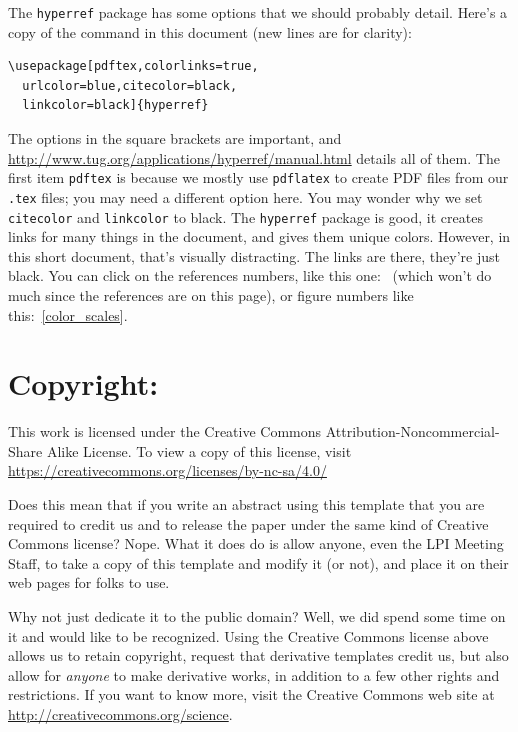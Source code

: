 \documentclass[twoside, 10pt]{article}
\begin{document}
The \verb=hyperref= package has some options that we should probably 
detail.  Here's a copy of the command in this document (new lines
are for clarity):
\begin{verbatim}
\usepackage[pdftex,colorlinks=true,
  urlcolor=blue,citecolor=black,
  linkcolor=black]{hyperref}
\end{verbatim}
\noindent
The options in the square brackets are important, and
\href{http://www.tug.org/applications/hyperref/manual.html}{http://www.tug.org/applications/hyperref/manual.html} details
all of them.  The first item \verb=pdftex= is because we mostly use
\verb=pdflatex= to create PDF files from our \verb=.tex= files; you may 
need a different option here.  You may wonder
why we set \verb=citecolor= and \verb=linkcolor= to black.  The
\verb=hyperref= package is good, it creates links for many 
things in the document, and gives them unique colors.
However, in this short document, that's visually distracting. 
The links are there, they're just black. You can click on the references
numbers, like this one:~\citep{kopka2003guide} (which won't do much since
the references are on this page), or figure numbers like
this:~\ref{color_scales}.

\section*{Copyright:}

This work is licensed under the Creative Commons
Attribution-Noncommercial-Share Alike License. To view a copy
of this license, visit \href{https://creativecommons.org/licenses/by-nc-sa/4.0/}{https://creativecommons.org/licenses/by-nc-sa/4.0/}

Does this mean that if you write an abstract using this template that
you are required to credit us and to release the paper under
the same kind of Creative Commons license?  Nope. What it does do is allow
anyone, even the LPI Meeting Staff, to take a copy of this template
and modify it (or not), and place it on their web pages for folks
to use.

Why not just dedicate it to the public domain?  Well,
we did spend some time on it and would like to be recognized.  Using
the Creative Commons license above allows us to retain copyright,
request that derivative templates credit us, but also allow for
\emph{anyone} to make derivative works, in addition to a few other
rights and restrictions.  If you want to know more, visit the
Creative Commons web site at \href{https://creativecommons.org/science/}{http://creativecommons.org/science}.
\end{document}
